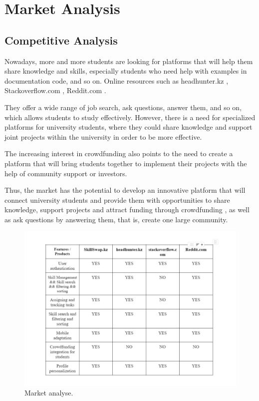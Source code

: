 \chapter{Market Analysis}\label{ch:C}
\section{Competitive Analysis}\label{companl}
Nowadays, more and more students are looking for platforms that will help them share knowledge and skills, especially students who need help with examples in documentation code, and so on. Online resources such as headhunter.kz \cite{headhunter}, Stackoverflow.com \cite{stackoverlow}, Reddit.com \cite{reddit}.
\par
\vspace{0.5cm}
They offer a wide range of job search, ask questions, answer them, and so on, which allows students to study effectively. However, there is a need for specialized platforms for university students, where they could share knowledge and support joint projects within the university in order to be more effective.
\par
\vspace{0.5cm}
The increasing interest in crowdfunding also points to the need to create a platform that will bring students together to implement their projects with the help of community support or investors.
\par
\vspace{0.5cm}
Thus, the market has the potential to develop an innovative platform that will connect university students and provide them with opportunities to share knowledge, support projects and attract funding through crowdfunding \cite{crowdfunding}, as well as ask questions by answering them, that is, create one large community.

\begin{figure}[ht]\label{fig:market}
  \centering
  \includegraphics[width=0.8\linewidth]{figures/market analyse.png}
  \caption{Market analyse.}
\end{figure}
\newpage
